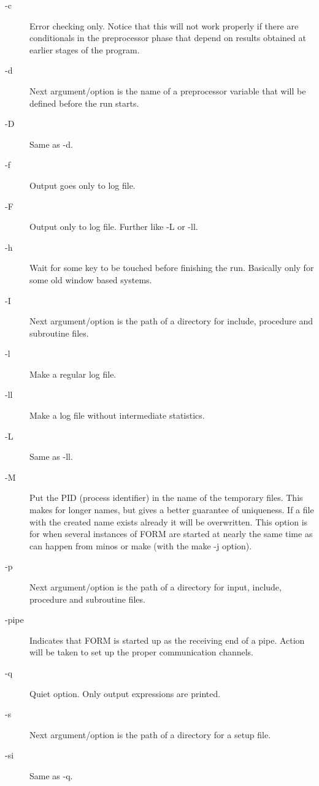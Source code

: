 \begin{description}
\item[-c] Error checking only. Notice that this will not work 
     properly if there are conditionals in the preprocessor phase that 
     depend on results obtained at earlier stages of the program.
\item[-d] Next argument/option is the name of a preprocessor 
     variable that will be defined before the run starts.
\item[-D] Same as -d.
\item[-f] Output goes only to log file.
\item[-F] Output only to log file. Further like -L or -ll.
\item[-h] Wait for some key to be touched before finishing the run.
     Basically only for some old window based systems.
\item[-I] Next argument/option is the path of a directory for 
     include, procedure and subroutine files.
\item[-l] Make a regular log file.
\item[-ll] Make a log file without intermediate statistics.
\item[-L] Same as -ll.
\item[-M] Put the PID (process identifier) in the name of the temporary 
     files. This makes for longer names, but gives a better guarantee of 
     uniqueness. If a file with the created name exists already it will be 
     overwritten. This option is for when several instances of FORM are 
     started at nearly the same time as can happen from minos or make (with 
     the make -j option).
\item[-p] Next argument/option is the path of a directory for 
     input, include, procedure and subroutine files.
\item[-pipe] Indicates that FORM is started up as the receiving 
     end of a pipe. Action will be taken to set up the proper communication 
     channels.
\item[-q] Quiet option. Only output expressions are printed.
\item[-s] Next argument/option is the path of a directory for a 
     setup file.
\item[-si] Same as -q.

\end{description}
